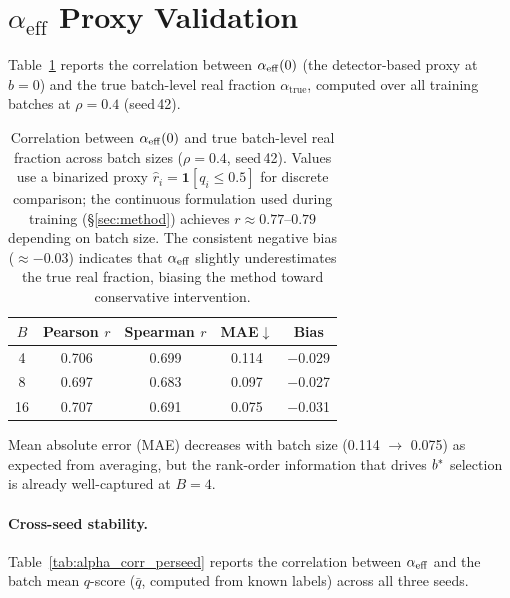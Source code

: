 \section{\texorpdfstring{$\alpha_{\mathrm{eff}}$}{alpha-eff} Proxy Validation}
\label{app:alpha_validation}

Table~\ref{tab:alpha_corr} reports the correlation between $\alpha_{\mathrm{eff}}(0)$ (the detector-based proxy at $b{=}0$) and the true batch-level real fraction $\alpha_{\mathrm{true}}$, computed over all training batches at $\rho{=}0.4$ (seed\,42).

\begin{table}[h]
\centering
\small
\begin{tabular}{@{}ccccc@{}}
\toprule
$B$ & Pearson $r$ & Spearman $r$ & MAE$\downarrow$ & Bias \\
\midrule
4  & 0.706 & 0.699 & 0.114 & $-$0.029 \\
8  & 0.697 & 0.683 & 0.097 & $-$0.027 \\
16 & 0.707 & 0.691 & 0.075 & $-$0.031 \\
\bottomrule
\end{tabular}
\caption{Correlation between $\alpha_{\mathrm{eff}}(0)$ and true batch-level real fraction across batch sizes ($\rho{=}0.4$, seed\,42).
Values use a binarized proxy $\hat{r}_i = \mathbf{1}[q_i \leq 0.5]$ for discrete comparison; the continuous formulation used during training (\S\ref{sec:method}) achieves $r \approx 0.77$--$0.79$ depending on batch size.
The consistent negative bias (${\approx}{-}0.03$) indicates that $\alpha_{\mathrm{eff}}$ slightly underestimates the true real fraction, biasing the method toward conservative intervention.}
\label{tab:alpha_corr}
\end{table}

Mean absolute error (MAE) decreases with batch size (0.114 $\to$ 0.075) as expected from averaging, but the rank-order information that drives $b^*$ selection is already well-captured at $B{=}4$.

\paragraph{Cross-seed stability.}
Table~\ref{tab:alpha_corr_perseed} reports the correlation between $\alpha_{\mathrm{eff}}$ and the batch mean $q$-score ($\bar{q}$, computed from known labels) across all three seeds.

